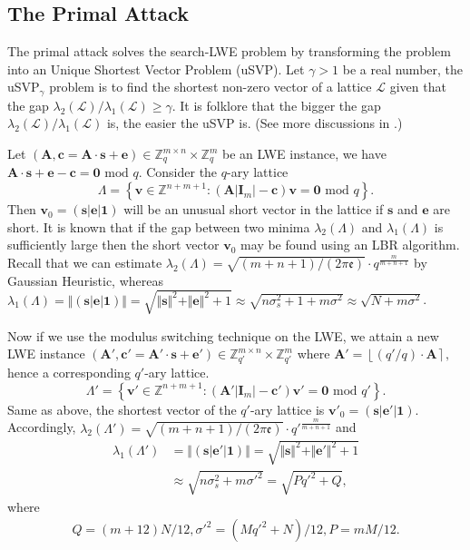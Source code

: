\documentclass{cta-author}
\begin{document}
\subsection{The Primal Attack}\label{primalattack}
The primal attack solves the search-LWE problem by transforming the problem into an Unique Shortest Vector Problem (uSVP). Let $\gamma>1$ be a real number, the uSVP$_{\gamma}$ problem is to find the shortest non-zero vector of a lattice $\mathcal{L}$ given that the gap $\lambda_2(\mathcal{L})/\lambda_1(\mathcal{L})\geq\gamma$. It is folklore that the bigger the gap $\lambda_2(\mathcal{L})/\lambda_1(\mathcal{L})$ is, the easier the uSVP is. (See more discussions in \cite{AFG14, GN08}.) 


 Let  $(\mathbf{A}, \mathbf{c}=\mathbf{A}\cdot \mathbf{s}+\mathbf{e}) \in \mathbb{Z}_q^{m \times n} \times \mathbb{Z}_q^m$ be an LWE instance, we have $\mathbf{A}\cdot \mathbf{s}+\mathbf{e}-\mathbf{c}=\mathbf{0} \text{ mod } q$.
Consider the $q$-ary lattice 
\begin{equation*}\label{primalla}
\Lambda=\left\{ \mathbf{v} \in \mathbb{Z}^{n+m+1}:(\mathbf{A}| \mathbf{I}_m|-\mathbf{c})\mathbf{v}=\mathbf{0} \text{ mod } q \right\}.
\end{equation*}
Then $\mathbf{v}_0=(\mathbf{s}| \mathbf{e}|\mathbf{1})$ will be an unusual short vector in the lattice if $\mathbf{s}$ and $\mathbf{e}$ are short. It is known that if the gap between two minima $\lambda_2(\Lambda)$ and $\lambda_1(\Lambda)$ is sufficiently large then the short vector $\mathbf{v}_0$ may be found using an LBR algorithm. Recall that we can estimate $\lambda_2(\Lambda)=\sqrt{(m+n+1)/(2 \pi \mathfrak{e})}\cdot q^{\frac{m}{m+n+1}}$ by Gaussian Heuristic, whereas $\lambda_1(\Lambda)=\Vert (\mathbf{s}| \mathbf{e}|\mathbf{1}) \Vert=\sqrt{\Vert \mathbf{s}\Vert^2+\Vert \mathbf{e}\Vert^2+1}\approx \sqrt{n\sigma_s^2+1+m\sigma^2}\approx \sqrt{N+m\sigma^2}$. %

Now if we use the modulus switching technique on the LWE, we attain a new LWE instance $(\mathbf{A'}, \mathbf{c'}=\mathbf{A'}\cdot \mathbf{s}+\mathbf{e'}) \in \mathbb{Z}_{q'}^{m \times n} \times \mathbb{Z}_{q'}^m$ where $\mathbf{A}'=\left\lfloor ({q'}/{q}) \cdot \mathbf{A} \right\rceil,$ hence a corresponding $q'$-ary lattice. 
$$\Lambda'=\left\{ \mathbf{v'} \in \mathbb{Z}^{n+m+1}:(\mathbf{A'}| \mathbf{I}_m|-\mathbf{c'})\mathbf{v'}=\mathbf{0} \text{ mod } q' \right\}.$$
Same as above, the shortest vector of the $q'$-ary lattice is $\mathbf{v'}_0=(\mathbf{s}| \mathbf{e'}|\mathbf{1})$. Accordingly, $\lambda_2(\Lambda')=\sqrt{(m+n+1)/(2 \pi \mathfrak{e})}\cdot {q'}^{\frac{m}{m+n+1}}$ and 
\begin{align*}
\lambda_1(\Lambda')&=\Vert (\mathbf{s}| \mathbf{e'}|\mathbf{1}) \Vert=\sqrt{\Vert \mathbf{s}\Vert^2+\Vert \mathbf{e'}\Vert^2+1}\\
&\approx \sqrt{n\sigma_s^2+m\sigma'^2}=\sqrt{Pq'^2+Q},
\end{align*}
where 
\begin{align}\label{keypq}
 Q=(m+12)N/12,\sigma'^2=(Mq'^2+N)/12, P=mM/12.
\end{align}
\end{document}
